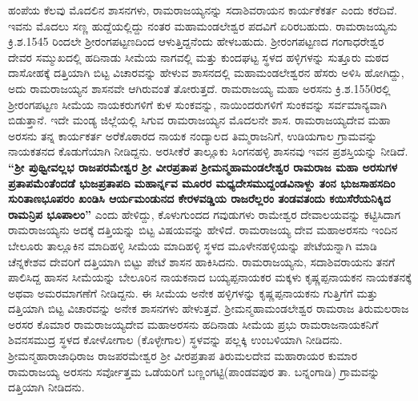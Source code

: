 ಹಂಪೆಯ ಕೆಲವು ಮೊದಲಿನ ಶಾಸನಗಳು, ರಾಮರಾಜಯ್ಯನನ್ನು ಸದಾಶಿವರಾಯನ ಕಾರ್ಯಕೆಕರ್ತ ಎಂದು ಕರೆದಿವೆ. ಇವನು ಮೊದಲು ಸಣ್ಣ ಹುದ್ದೆಯಲ್ಲಿದ್ದು ನಂತರ ಮಹಾಮಂಡಲೇಶ್ವರ ಪದವಿಗೆ ಏರಿರಬಹುದು. \hbox{ರಾಮರಾಜಯ್ಯನು} ಕ್ರಿ.ಶ.1545 ರಿಂದಲೇ ಶ‍್ರೀರಂಗಪಟ್ಟಣದಿಂದ ಆಳುತ್ತಿದ್ದನೆಂದು ಹೇಳಬಹುದು. ಶ‍್ರೀರಂಗಪಟ್ಟಣದ ಗಂಗಾಧರೇಶ್ವರ ದೇವರ ಸಮ್ಮುಖದಲ್ಲಿ ಹದಿನಾಡು ಸೀಮೆಯ ನಾಗವಲ್ಲಿ ಮತ್ತು ಕುಂದಘಟ್ಟ ಸ್ಥಳದ ಹಳ್ಳಿಗಳನ್ನು ಸುತ್ತೂರು ಮಠದ ದಾಸೋಹಕ್ಕೆ ದತ್ತಿಯಾಗಿ ಬಿಟ್ಟ ವಿಚಾರವನ್ನು ಹೇಳುವ ಶಾಸನದಲ್ಲಿ ಮಹಾಮಂಡಲೇಶ್ವರನ ಹೆಸರು ಅಳಿಸಿ ಹೋಗಿದ್ದು, ಅದು ರಾಮರಾಜಯ್ಯನ ಶಾಸನವೇ ಆಗಿರುವಂತೆ ತೋರುತ್ತದೆ. ರಾಮರಾಜಯ್ಯ ಮಹಾ ಅರಸನು ಕ್ರಿ.ಶ.1550ರಲ್ಲಿ ಶ‍್ರೀರಂಗಪಟ್ಟಣ ಸೀಮೆಯ ನಾಯಕರುಗಳಿಗೆ ಕುಳ ಸುಂಕವನ್ನು, ನಾಯಿಂದರುಗಳಿಗೆ ಸುಂಕವನ್ನು ಸರ್ವಮಾನ್ಯವಾಗಿ ಬಿಡುತ್ತಾನೆ. ಇದೇ ಮಂಡ್ಯ ಜಿಲ್ಲೆಯಲ್ಲಿ ಸಿಗುವ ರಾಮರಾಜಯ್ಯನ ಮೊದಲನೇ ಶಾಸ. ರಾಮರಾಜಯ್ಯದೇವ ಮಹಾ ಅರಸನು ತನ್ನ ಕಾರ್ಯಕರ್ತ ಅರೆಕೊಠಾರದ ನಾಯಕ ನಂದ್ಯಾಲದ ತಿಮ್ಮರಾಜನಿಗೆ, ಉಡಿಯಗಾಲ ಗ್ರಾಮವನ್ನು ನಾಯಕತನದ ಕೊಡುಗೆಯಾಗಿ ನೀಡಿದ್ದನು. ಅರಸೀಕೆರೆ ತಾಲ್ಲೂಕು ಸಿಂಗನಹಳ್ಳಿ ಶಾಸನವು ಇವನ ಪ್ರಶಸ್ತಿಯನ್ನು ನೀಡಿದೆ. \textbf{“ಶ‍್ರೀ ಪ್ರುಥ್ವೀವಲ್ಲಭ ರಾಜಪರಮೇಶ್ವರ ಶ‍್ರೀ ವೀರಪ್ರತಾಪ ಶ‍್ರೀಮನ್ಮಹಾಮಂಡಲೇಶ್ವರ ರಾಮರಾಜ ಮಹಾ ಅರಸುಗಳ ಪ್ರತಾಪಮೆಂತೆಂದಡೆ ಭುಜಪ್ರತಾಪದಿ ಮಹಾರ್ನ್ನವ ಮೂರರ ಮಧ್ಯದೇಸಮುದ್ದಂಡವಿನಾಳ್ದು ತಂನ ಭುಜಸಾಹಸದಿಂ ಸುರಿತಾಣಭೂಪರಂ ಖಂಡಿಸಿ ಆರ್ಯಮಂಡುನದ ಕೇರಳವಡ್ಡಿಯ ರಾಜರೆಲ್ಲರಂ ತಂಡವತಂದು ಕಯಿಸೆರೆಯನಿಕ್ಕಿದ ರಾಮನ್ರಿಪ ಭೂಪಾಲಂ”} ಎಂದು ಹೇಳಿದ್ದು, ಕೊಳುಗುಂದದ ಗವುಡುಗಳು ರಾಮೇಶ್ವರ ದೇವಾಲಯವನ್ನು ಕಟ್ಟಿಸಿದಾಗ ರಾಮರಾಜಯ್ಯನು ಅದಕ್ಕೆ ದತ್ತಿಯನ್ನು ಬಿಟ್ಟ ವಿಷಯವನ್ನು ಹೇಳಿದೆ. ರಾಮರಾಜಯ್ಯ ದೇವ ಮಹಾಅರಸನು ಇಂದಿನ ಬೇಲೂರು ತಾಲ್ಲೂಕಿನ ಮಾದಿಹಳ್ಳಿ ಸೀಮೆಯ ಮಾದಿಹಳ್ಳಿ ಸ್ಥಳದ ಮೂಳೇನಹಳ್ಳಿಯನ್ನು ಪೇಟೆಯನ್ನಾಗಿ ಮಾಡಿ ಚೆನ್ನಕೇಶವ ದೇವರಿಗೆ ದತ್ತಿಯಾಗಿ ಬಿಟ್ಟು ಪೇಟೆ ಶಾಸನ ಹಾಕಿಸಿದನು. ರಾಮರಾಜಯ್ಯನು, ಸದಾಶಿವರಾಯನು ತನಗೆ ಪಾಲಿಸಿದ್ದ ಹಾಸನ ಸೀಮೆಯನ್ನು ಬೇಲೂರಿನ ನಾಯಕನಾದ ಬಯ್ಯಪ್ಪನಾಯಕರ ಮಕ್ಕಳು ಕೃಷ್ಣಪ್ಪನಾಯಕನ ನಾಯಕತನಕ್ಕೆ ಅಥವಾ ಅಮರಮಾಗಣೆಗೆ ನೀಡಿದ್ದನು. ಈ ಸೀಮೆಯ ಅನೇಕ ಹಳ್ಳಿಗಳನ್ನು ಕೃಷ್ಣಪ್ಪನಾಯಕನು ಗುತ್ತಿಗೆಗೆ ಮತ್ತು ದತ್ತಿಯಾಗಿ ಬಿಟ್ಟ ವಿಚಾರವನ್ನು ಅನೇಕ ಶಾಸನಗಳು ಹೇಳುತ್ತವೆ. ಶ‍್ರೀಮನ್ಮಹಾಮಂಡಲೇಶ್ವರ ರಾಮರಾಜ ತಿರುಮಲರಾಜ ಅರಸರ ಕೊಮಾರ ರಾಮರಾಜಯ್ಯದೇವ ಮಹಾಅರಸನು ಹದಿನಾಡು ಸೀಮೆಯ ಪ್ರಭು ರಾಮರಾಜನಾಯಕನಿಗೆ ಶಿವನಸಮುದ್ರ ಸ್ಥಳದ ಕೋಳೋಗಾಲ (ಕೊಳ್ಳೇಗಾಲ) ಸ್ಥಳವನ್ನು ಪಲ್ಲಕ್ಕಿ ಉಂಬಳಿಯಾಗಿ ನೀಡಿದನು. ಶ‍್ರೀಮನ್ಮಹಾರಾಜಾಧಿರಾಜ ರಾಜಪರಮೇಶ್ವರ ಶ‍್ರೀ ವೀರಪ್ರತಾಪ ತಿರುಮಲದೇವ ಮಹಾರಾಯರ ಕುಮಾರ ರಾಮರಾಜಯ್ಯ ಅರಸನು ಸರ್ವೋತ್ತಮ ಒಡೆಯರಿಗೆ ಬಣ್ಣಂಗಟ್ಟಿ(ಪಾಂಡವಪುರ ತಾ. ಬನ್ನಂಗಾಡಿ) ಗ್ರಾಮವನ್ನು ದತ್ತಿಯಾಗಿ ನೀಡಿದನು.

